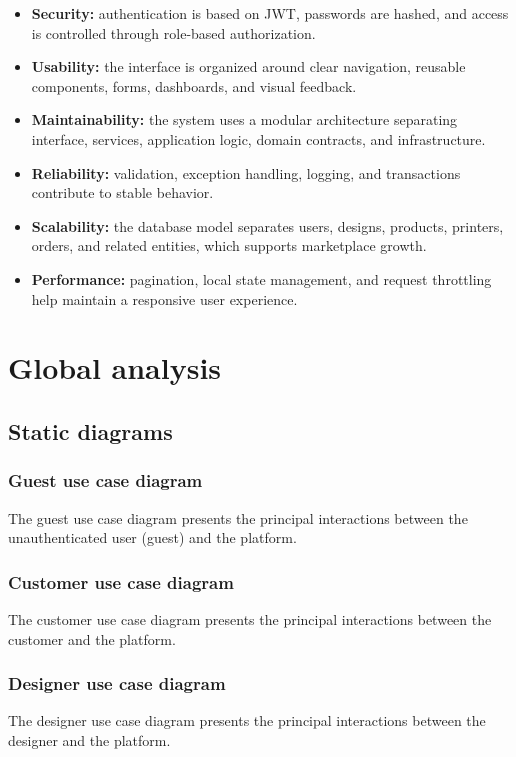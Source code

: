 \begin{itemize}
    \item \textbf{Security:} authentication is based on JWT, passwords are hashed, and access is controlled through role-based authorization.
    \item \textbf{Usability:} the interface is organized around clear navigation, reusable components, forms, dashboards, and visual feedback.
    \item \textbf{Maintainability:} the system uses a modular architecture separating interface, services, application logic, domain contracts, and infrastructure.
    \item \textbf{Reliability:} validation, exception handling, logging, and transactions contribute to stable behavior.
    \item \textbf{Scalability:} the database model separates users, designs, products, printers, orders, and related entities, which supports marketplace growth.
    \item \textbf{Performance:} pagination, local state management, and request throttling help maintain a responsive user experience.
\end{itemize}

\section{Global analysis}
\subsection{Static diagrams}

\subsubsection{Guest use case diagram}
The guest use case diagram presents the principal interactions between the unauthenticated user (guest) and the platform.
\pagebreak
\subsubsection{Customer use case diagram}
The customer use case diagram presents the principal interactions between the customer and the platform.
\pagebreak
\subsubsection{Designer use case diagram}
The designer use case diagram presents the principal interactions between the designer and the platform.
\pagebreak
